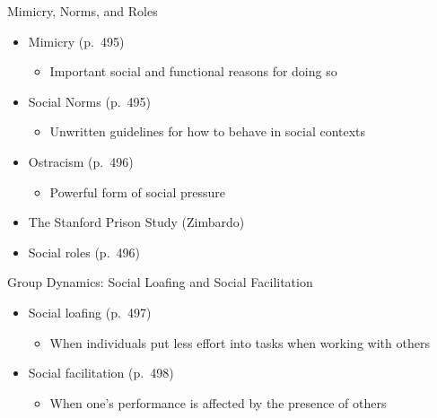 \documentclass[
]{book}
\providecommand{\tightlist}{%
  \setlength{\itemsep}{0pt}\setlength{\parskip}{0pt}}
\begin{document}
\begin{reflect}
Mimicry, Norms, and Roles

\begin{itemize}
\tightlist
\item
  Mimicry (p.~495)

  \begin{itemize}
  \tightlist
  \item
    Important social and functional reasons for doing so\\
  \end{itemize}
\item
  Social Norms (p.~495)

  \begin{itemize}
  \tightlist
  \item
    Unwritten guidelines for how to behave in social contexts\\
  \end{itemize}
\item
  Ostracism (p.~496)

  \begin{itemize}
  \tightlist
  \item
    Powerful form of social pressure\\
  \end{itemize}
\item
  The Stanford Prison Study (Zimbardo)\\
\item
  Social roles (p.~496)
\end{itemize}

Group Dynamics: Social Loafing and Social Facilitation

\begin{itemize}
\tightlist
\item
  Social loafing (p.~497)

  \begin{itemize}
  \tightlist
  \item
    When individuals put less effort into tasks when working with others\\
  \end{itemize}
\item
  Social facilitation (p.~498)

  \begin{itemize}
  \tightlist
  \item
    When one's performance is affected by the presence of others
  \end{itemize}
\end{itemize}


\end{reflect}
\end{document}
